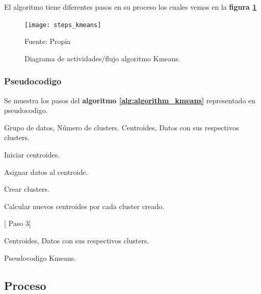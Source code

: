 El algoritmo tiene diferentes pasos en su proceso los cuales vemos en la \textbf{figura \ref{fig:steps_kmeans}}

\begin{figure}[H]
	\begin{center}
		\texttt{[image: steps\_kmeans]}
	\end{center}
	\begin{center}
		\vskip -0.5cm
		\caption{\label{fig:steps_kmeans}\small{Diagrama de actividades/flujo algoritmo Kmeans.}}
		{\small{Fuente: Propia }}
	\end{center}
\end{figure}

\subsubsection{Pseudocodigo}
Se muestra los pasos del \textbf{ algoritmo \ref{alg:algorithm_kmeans} } representado en pseudocodigo.

\begin{algorithm}[H]
\begin{algorithmic}[1]
		\REQUIRE Grupo de datos, Número de clusters.  %
		\ENSURE Centroides, Datos con sus respectivos clusters.                                                       %
		
		\STATE Iniciar centroides.
					
		\STATE Asignar datos al centroide. \label{marker}
			
		\STATE Crear clusters.
			
		\STATE Calcular nuevos centroides por cada cluster creado.
			
			 [ Paso 3]
		\ENDIF
			
		\RETURN  Centroides, Datos con sus respectivos clusters.
		
		\begin{center}
		    \vskip -0.5cm
	    	\caption{\label{alg:algorithm_kmeans}\small{Pseudocodigo  Kmeans.}}
	    \end{center}

\end{algorithmic}
\end{algorithm}


\subsection{Proceso}

